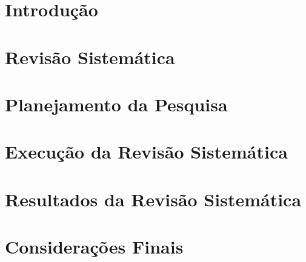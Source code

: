 \vspace{2cm}

\section{Introdução}


\section{Revisão Sistemática}


\vspace{1cm}
\section{Planejamento da Pesquisa}

\label{sec:planejamento}

\vspace{1cm}
\section{Execução da Revisão Sistemática}


\vspace{1cm}
\section{Resultados da Revisão Sistemática}


\vspace{1cm}
\section{Considerações Finais}
